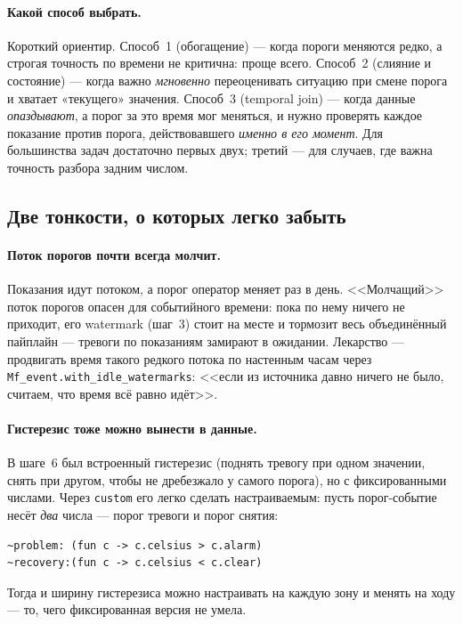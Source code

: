 \documentclass[11pt,a4paper]{article}
\begin{document}
\paragraph{Какой способ выбрать.} Короткий ориентир. Способ~1
(обогащение) --- когда пороги меняются редко, а строгая точность по
времени не критична: проще всего. Способ~2 (слияние и состояние) ---
когда важно \emph{мгновенно} переоценивать ситуацию при смене порога и
хватает «текущего» значения. Способ~3 (temporal join) --- когда данные
\emph{опаздывают}, а порог за это время мог меняться, и нужно проверять
каждое показание против порога, действовавшего \emph{именно в его
момент}. Для большинства задач достаточно первых двух; третий --- для
случаев, где важна точность разбора задним числом.

\subsection{Две тонкости, о которых легко забыть}

\paragraph{Поток порогов почти всегда молчит.} Показания идут потоком, а
порог оператор меняет раз в день. <<Молчащий>> поток порогов опасен для
событийного времени: пока по нему ничего не приходит, его watermark
(шаг~3) стоит на месте и тормозит весь объединённый пайплайн --- тревоги
по показаниям замирают в ожидании. Лекарство --- продвигать время
такого редкого потока по настенным часам через
\texttt{Mf\_event.with\_idle\_watermarks}: <<если из источника давно
ничего не было, считаем, что время всё равно идёт>>.

\paragraph{Гистерезис тоже можно вынести в данные.} В шаге~6 был
встроенный гистерезис (поднять тревогу при одном значении, снять при
другом, чтобы не дребезжало у самого порога), но с фиксированными
числами. Через \texttt{custom} его легко сделать настраиваемым: пусть
порог-событие несёт \emph{два} числа --- порог тревоги и порог снятия:

\begin{lstlisting}
~problem: (fun c -> c.celsius > c.alarm)
~recovery:(fun c -> c.celsius < c.clear)
\end{lstlisting}

Тогда и ширину гистерезиса можно настраивать на каждую зону и менять на
ходу --- то, чего фиксированная версия не умела.
\end{document}
